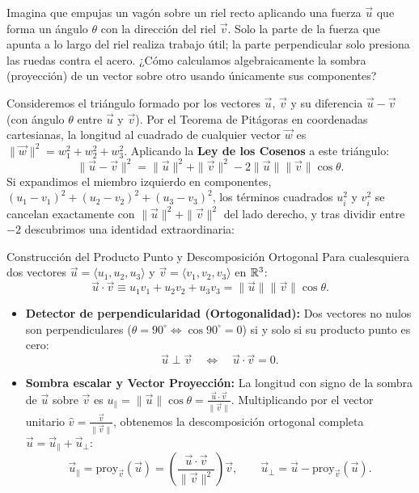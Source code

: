 \documentclass[11pt,letterpaper]{article}
\begin{document}

Imagina que empujas un vagón sobre un riel recto aplicando una fuerza $\vec{u}$ que forma un ángulo $\theta$ con la dirección del riel $\vec{v}$. Solo la parte de la fuerza que apunta a lo largo del riel realiza trabajo útil; la parte perpendicular solo presiona las ruedas contra el acero. ¿Cómo calculamos algebraicamente la sombra (proyección) de un vector sobre otro usando únicamente sus componentes?

Consideremos el triángulo formado por los vectores $\vec{u}$, $\vec{v}$ y su diferencia $\vec{u} - \vec{v}$ (con ángulo $\theta$ entre $\vec{u}$ y $\vec{v}$). Por el Teorema de Pitágoras en coordenadas cartesianas, la longitud al cuadrado de cualquier vector $\vec{w}$ es $\|\vec{w}\|^2 = w_1^2 + w_2^2 + w_3^2$. Aplicando la \textbf{Ley de los Cosenos} a este triángulo:
\[
\|\vec{u} - \vec{v}\|^2 = \|\vec{u}\|^2 + \|\vec{v}\|^2 - 2\|\vec{u}\|\|\vec{v}\|\cos\theta.
\]
Si expandimos el miembro izquierdo en componentes, $(u_1 - v_1)^2 + (u_2 - v_2)^2 + (u_3 - v_3)^2$, los términos cuadrados $u_i^2$ y $v_i^2$ se cancelan exactamente con $\|\vec{u}\|^2 + \|\vec{v}\|^2$ del lado derecho, y tras dividir entre $-2$ descubrimos una identidad extraordinaria:

\begin{theorembox}{Construcción del Producto Punto y Descomposición Ortogonal}
Para cualesquiera dos vectores $\vec{u} = \langle u_1, u_2, u_3 \rangle$ y $\vec{v} = \langle v_1, v_2, v_3 \rangle$ en $\mathbb{R}^3$:
\[
\vec{u} \cdot \vec{v} \equiv u_1 v_1 + u_2 v_2 + u_3 v_3 = \|\vec{u}\| \|\vec{v}\| \cos\theta.
\]
\begin{itemize}
    \item \textbf{Detector de perpendicularidad (Ortogonalidad):} Dos vectores no nulos son perpendiculares ($\theta = 90^\circ \iff \cos 90^\circ = 0$) si y solo si su producto punto es cero:
    \[
    \vec{u} \perp \vec{v} \quad \Longleftrightarrow \quad \vec{u} \cdot \vec{v} = 0.
    \]
    \item \textbf{Sombra escalar y Vector Proyección:} La longitud con signo de la sombra de $\vec{u}$ sobre $\vec{v}$ es $u_\parallel = \|\vec{u}\|\cos\theta = \frac{\vec{u}\cdot\vec{v}}{\|\vec{v}\|}$. Multiplicando por el vector unitario $\hat{v} = \frac{\vec{v}}{\|\vec{v}\|}$, obtenemos la descomposición ortogonal completa $\vec{u} = \vec{u}_\parallel + \vec{u}_\perp$:
    \[
    \vec{u}_\parallel = \text{proy}_{\vec{v}}(\vec{u}) = \left(\frac{\vec{u}\cdot\vec{v}}{\|\vec{v}\|^2}\right)\vec{v}, \qquad \vec{u}_\perp = \vec{u} - \text{proy}_{\vec{v}}(\vec{u}).
    \]
\end{itemize}
\end{theorembox}
\end{document}

